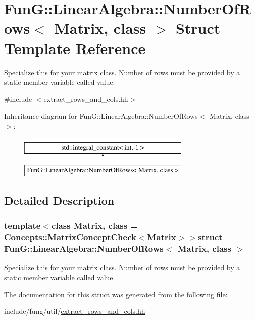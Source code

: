 \hypertarget{structFunG_1_1LinearAlgebra_1_1NumberOfRows}{\section{Fun\-G\-:\-:Linear\-Algebra\-:\-:Number\-Of\-Rows$<$ Matrix, class $>$ Struct Template Reference}
\label{structFunG_1_1LinearAlgebra_1_1NumberOfRows}
}


Specialize this for your matrix class. Number of rows must be provided by a static member variable called value.  




{\ttfamily \#include $<$extract\-\_\-rows\-\_\-and\-\_\-cols.\-hh$>$}

Inheritance diagram for Fun\-G\-:\-:Linear\-Algebra\-:\-:Number\-Of\-Rows$<$ Matrix, class $>$\-:\begin{figure}[H]
\begin{center}
\leavevmode
\includegraphics[height=2.000000cm]{structFunG_1_1LinearAlgebra_1_1NumberOfRows}
\end{center}
\end{figure}


\subsection{Detailed Description}
\subsubsection*{template$<$class Matrix, class = Concepts\-::\-Matrix\-Concept\-Check$<$\-Matrix$>$$>$struct Fun\-G\-::\-Linear\-Algebra\-::\-Number\-Of\-Rows$<$ Matrix, class $>$}

Specialize this for your matrix class. Number of rows must be provided by a static member variable called value. 

The documentation for this struct was generated from the following file\-:\begin{DoxyCompactItemize}
\item 
include/fung/util/\hyperlink{extract__rows__and__cols_8hh}{extract\-\_\-rows\-\_\-and\-\_\-cols.\-hh}\end{DoxyCompactItemize}
